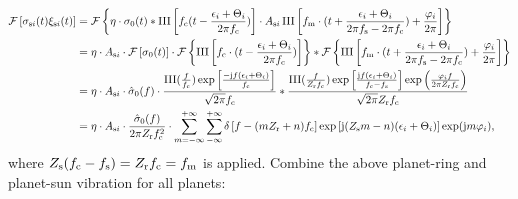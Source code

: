 \documentclass[a4paper,fleqn]{cas-sc}%
\begin{document}
\begin{equation}
    \begin{split}
        \mathcal{F}\left[\sigma_{{\rm s}i}(t) \xi_{{\rm s}i}(t)\right]&=\mathcal{F}\left\{ \eta \cdot \sigma_0(t) \ast \operatorname{III}\left[f_{\rm c}(t-\frac{\epsilon_i+\Theta_i}{2 \pi f_{\rm c}})\right] \cdot A_{{\rm s}i} \operatorname{III} \left[ f_{\rm m} \cdot (t+ \frac{\epsilon_i+\Theta_i}{2\pi f_{\rm s} -2\pi f_{\rm c}} ) +\frac{\varphi_i}{2\pi} \right] \right\}\\
        &=\eta \cdot A_{{\rm s}i} \cdot \mathcal{F}\left[\sigma_0(t)\right] \cdot \mathcal{F}\left\{ \operatorname{III}\left[f_{\rm c} \cdot (t-\frac{\epsilon_i+\Theta_i}{2\pi f_{\rm c}}) \right] \right\} \ast \mathcal{F}\left\{\operatorname{III} \left[ f_{\rm m} \cdot (t+ \frac{\epsilon_i+\Theta_i}{2\pi f_{\rm s} -2\pi f_{\rm c}} ) +\frac{\varphi_i}{2\pi} \right]\right\}\\
        &=\eta \cdot A_{{\rm s}i} \cdot \hat{\sigma}_0(f) \cdot \frac{\operatorname{III}(\frac{f}{f_{\rm c}}) \exp\left[\frac{-{\rm j}f(\epsilon_i+\Theta_i)}{f_{\rm c}}\right]}{\sqrt{2 \pi} f_{\rm c}} \ast \frac{\operatorname{III}(\frac{f}{Z_{\rm r}f_{\rm c}})\exp\left[\frac{{\rm j}f(\epsilon_i+\Theta_i)}{f_{\rm c}-f_{\rm s}}\right] \exp\left(\frac{\varphi_i f}{2\pi Z_{\rm r} f_{\rm c} } \right)}{\sqrt{2 \pi }Z_{\rm r} f_{\rm c}}\\
        &=\eta \cdot A_{{\rm s}i} \cdot \frac{\hat{\sigma}_0(f)}{2 \pi  Z_{\rm r} f_{\rm c}^2} \cdot \sum_{m=-\infty}^{+\infty} \sum_{-\infty}^{+\infty} \delta\left[f-(m Z_{\rm r}+ n)f_{\rm c} \right] \exp\left[ {\rm j} (Z_{\rm s} m - n)(\epsilon_i+\Theta_i) \right] \exp({\rm j}m \varphi_i),
    \end{split}
\end{equation}
where $Z_{\rm s}  (f_{\rm c} -f_{\rm s})= Z_{\rm r} f_{\rm c} =f_{\rm m}$ is applied. Combine the above planet-ring and planet-sun vibration for all planets:
\end{document}
